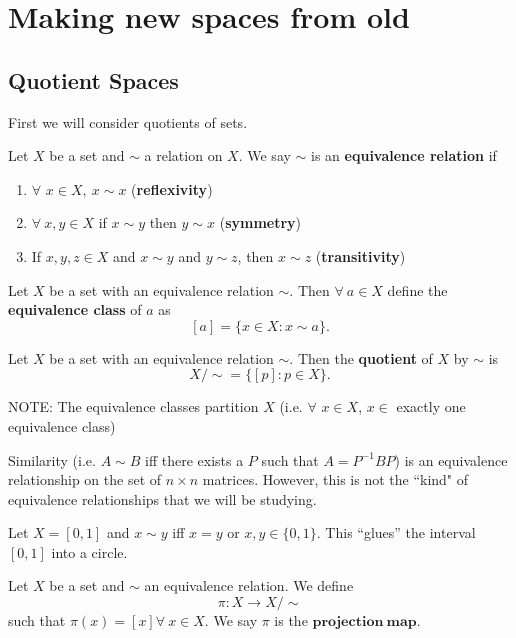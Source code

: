 

\chapter{Making new spaces from old} 
\section{Quotient Spaces}

First we will consider quotients of sets. 
\begin{definition}
	Let $X$ be a set and $\sim$ a relation on $X$. We say $\sim$ is an \textbf{equivalence relation} if 
	\begin{enumerate}
		\item $\forall$ $x \in X, \ x\sim x$ (\textbf{reflexivity}) 
		\item $\forall \ x, y \in X$ if $x\sim y$ then $y\sim x$ (\textbf{symmetry}) 
		\item If $x, y, z \in X$ and $x\sim y$ and $y\sim z$, then $x\sim z$ (\textbf{transitivity}) 
	\end{enumerate}
\end{definition}
\begin{definition}
	Let $X$ be a set with an equivalence relation $\sim$. Then $\forall \ a \in X$ define the \textbf{equivalence class} of $a$ as
	\[[a] = \{x \in X : x\sim a \}.\]
\end{definition}
\begin{definition}
	Let $X$ be a set with an equivalence relation $\sim$. Then the \textbf{quotient} of $X$ by $\sim$ is
	\[X /\!\sim = \{ [p] : p \in X\}.\]
\end{definition}
NOTE: The equivalence classes partition $X$ (i.e. $\forall$ $x \in X$, $x \in$ exactly one equivalence class) 
\begin{example}
	Similarity (i.e. $A \sim B$ iff there exists a $P$ such that $A = P^{-1}BP$) is an equivalence relationship on the set of $n \times n$ matrices. However, this is not the ``kind" of equivalence relationships that we will be studying. 
\end{example}
\begin{example}
	Let $X = [0,1]$ and $x\sim y$ iff $x = y$ or $x,y \in \{0,1\}$. This ``glues'' the interval $[0,1]$ into a circle. 
\end{example}
\begin{definition}
	Let $X$ be a set and $\sim$ an equivalence relation. We define $$\pi: X \rightarrow X /\!\sim$$ such that $\pi(x) = [x] \forall \ x \in X$. We say $\pi$ is the $\mathbf{projection \ map}$. 
\end{definition}

